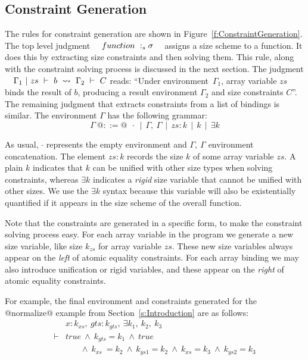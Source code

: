 \subsection{Constraint Generation}
The rules for constraint generation are shown in Figure~\ref{f:ConstraintGeneration}. The top level judgment ~~$function ~:_{s} \sigma$~~ assigns a size scheme to a function. It does this by extracting size constraints and then solving them. This rule, along with the constraint solving process is discussed in the next section. The judgment ~~$\Gamma_1 ~|~ zs ~\vdash~ b ~\leadsto~ \Gamma_2 ~\vdash~ C$ reads: ``Under environment~$\Gamma_1$, array variable $zs$ binds the result of $b$, producing a result environment $\Gamma_2$ and size constraints $C$''. The remaining judgment that extracts constraints from a list of bindings is similar. The environment $\Gamma$ has the following grammar:
$$
\Gamma~ @::=@ ~~\cdot ~~|~~ \Gamma,~ \Gamma ~~|~~ zs : k ~~|~~ k ~~|~~ \exists k
$$

As usual, $\cdot$ represents the empty environment and  $\Gamma,~ \Gamma$
environment concatenation. The element $zs : k$ records the size $k$ of some
array variable $zs$. A plain $k$ indicates that $k$ can be unified with other
size types when solving constraints, whereas $\exists k$ indicates a  \emph{rigid} size variable that cannot be unified with other sizes. We use the $\exists k$ syntax because this variable will also be existentially quantified if it appears in the size scheme of the overall function.

Note that the constraints are generated in a specific form, to make the constraint solving process easy. For each array variable in the program we generate a new size variable, like size $k_{zs}$ for array variable $zs$. These new size variables always appear on the \emph{left} of atomic equality constraints. For each array binding we may also introduce unification or rigid variables, and these appear on the \emph{right} of atomic equality constraints.

For example, the final environment and constraints generated for the @normalize@ example from Section~\ref{s:Introduction} are as follows:
$$
\begin{array}{ll}
       & x : k_{xs},~ gts : k_{gts},~ \exists k_1,~ k_2,~ k_3 
\\
\vdash & true 
        ~\wedge~  k_{gts} = k_1
        ~\wedge~  true
\\     &~~~~~~~~ 
          \wedge~  k_{xs}  ~= k_2
        ~ \wedge~  k_{ys1}  = k_2 
        ~ \wedge~  k_{xs}   = k_3
        ~ \wedge~  k_{ys2}  = k_3
\end{array}
$$


